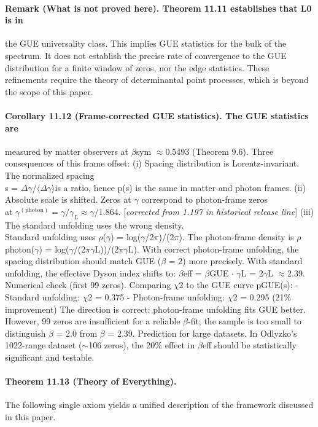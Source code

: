 \documentclass[12pt,a4paper]{article}
\DeclareRobustCommand{\QSCver}[1]{archival stage}
\newcommand{\gL}{\gamma_L}
\renewcommand{\QSCver}[1]{historical release line}
\begin{document}
\paragraph*{Remark (What is not proved here). Theorem 11.11 establishes that L0 is in}
the GUE universality class. This implies GUE statistics for the bulk of the spectrum. It does not establish the precise rate of convergence to the GUE distribution for a finite window of zeros, nor the edge statistics. These refinements require the theory of determinantal point processes, which is beyond the scope of this paper.
\paragraph*{Corollary 11.12 (Frame-corrected GUE statistics). The GUE statistics are}
measured by matter observers at $\beta$sym $\approx$0.5493 (Theorem 9.6). Three consequences of this frame offset:
(i) Spacing distribution is Lorentz-invariant. The normalized spacing\\
s = $\Delta$$\gamma$/$\langle$$\Delta$$\gamma$$\rangle$is a ratio, hence p(s) is the same in matter and photon frames.
(ii) Absolute scale is shifted. Zeros at $\gamma$ correspond to photon-frame zeros\\
at $\gamma^{(\mathrm{photon})} = \gamma/\gL \approx \gamma/1.864$. [\emph{corrected from 1.197 in \QSCver{v2.29.1}}]
(iii) The standard unfolding uses the wrong density.\\
Standard unfolding uses $\rho$($\gamma$) = log($\gamma$/2$\pi$)/(2$\pi$). The photon-frame density is $\rho$photon($\gamma$) = log($\gamma$/(2$\pi$$\gamma$L))/(2$\pi$$\gamma$L). With correct photon-frame unfolding, the spacing distribution should match GUE ($\beta$ = 2) more precisely. With standard unfolding, the effective Dyson index shifts to: $\beta$eff = $\beta$GUE $\cdot$ $\gamma$L = 2$\gamma$L $\approx$2.39. Numerical check (first 99 zeros). Comparing $\chi$2 to the GUE curve pGUE(s):
- Standard unfolding: $\chi$2 = 0.375
- Photon-frame unfolding: $\chi$2 = 0.295
(21\% improvement) The direction is correct: photon-frame unfolding fits GUE better. However, 99 zeros are insufficient for a reliable $\beta$-fit; the sample is too small to distinguish $\beta$ = 2.0 from $\beta$ = 2.39. Prediction for large datasets. In Odlyzko's 1022-range dataset ($\sim$106 zeros), the 20\% effect in $\beta$eff should be statistically significant and testable.
\paragraph*{Theorem 11.13 (Theory of Everything).}
The following single axiom yields a unified description of the framework discussed in this paper.
\end{document}
